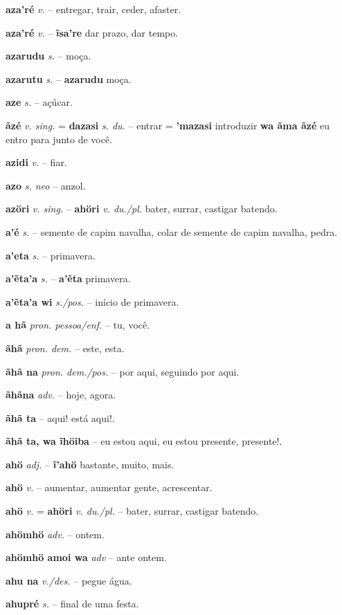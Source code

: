 \textbf{aza'ré} \textit{v.} -- entregar, trair, ceder, afaster.

\textbf{aza'ré} \textit{v.} -- \textbf{ĩsa're} dar prazo, dar tempo.

\textbf{azarudu} \textit{s.} -- moça.

\textbf{azarutu} \textit{s.} -- \textbf{azarudu} moça.

\textbf{aze} \textit{s.} -- açúcar.

\textbf{ãzé} \textit{v. sing.} = \textbf{dazasi} \textit{s. du.} -- entrar  = \textbf{'mazasi} introduzir  \textbf{wa ãma ãzé} eu entro para junto de você.

\textbf{azidi} \textit{v.} -- fiar.

\textbf{azo} \textit{s. neo} -- anzol.

\textbf{azöri} \textit{v. sing.} -- \textbf{ahöri} \textit{v. du./pl.} bater, surrar, castigar batendo.

\textbf{a'é} \textit{s.} -- semente de capim navalha, colar de semente de capim navalha, pedra.

\textbf{a'eta} \textit{s.} -- primavera.

\textbf{a'ẽta'a} \textit{s.} -- \textbf{a'ẽta} primavera.

\textbf{a'ẽta'a wi} \textit{s./pos.} -- início de primavera.

\textbf{a hã} \textit{pron. pessoa/enf.} -- tu, você.

\textbf{ãhã} \textit{pron. dem.} -- este, esta.

\textbf{ãhã na} \textit{pron. dem./pos.} -- por aqui, seguindo por aqui.

\textbf{ãhãna} \textit{adv.} -- hoje, agora.

\textbf{ãhã ta} -- aqui! está aqui!.

\textbf{ãhã ta, wa ĩhöiba} -- eu estou aqui, eu estou presente, presente!.

\textbf{ahö} \textit{adj.} -- \textbf{ĩ'ahö} bastante, muito, mais.

\textbf{ahö} \textit{v.} -- aumentar, aumentar gente, acrescentar.

\textbf{ahö} \textit{v.} = \textbf{ahöri} \textit{v. du./pl.} -- bater, surrar, castigar batendo.

\textbf{ahömhö} \textit{adv.} -- ontem.

\textbf{ahömhö amoi wa} \textit{adv} -- ante ontem.

\textbf{ahu na} \textit{v./des.} -- pegue água.

\textbf{ahupré} \textit{s.} -- final de uma festa.

